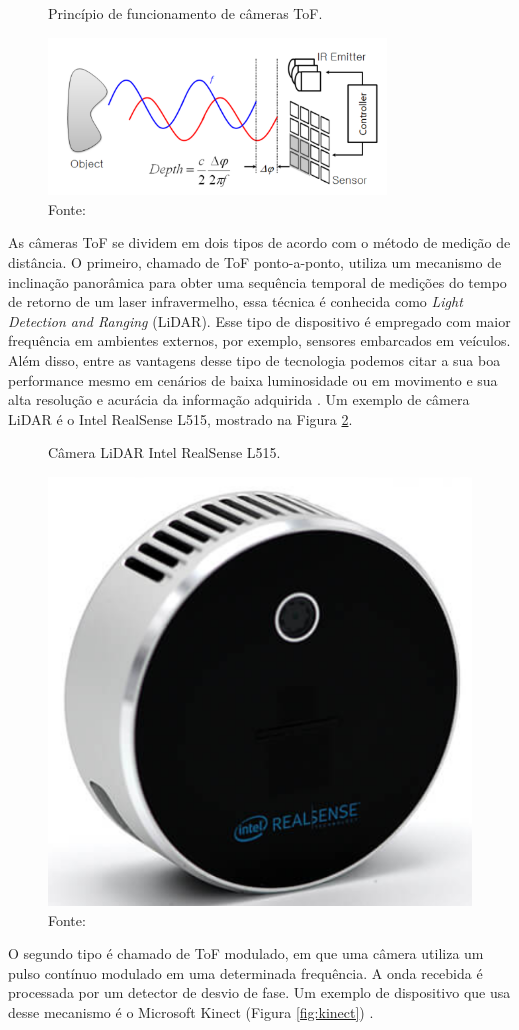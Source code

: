 \begin{figure}[h]
    \centering   
    \caption{Princípio de funcionamento de câmeras ToF.}
    \includegraphics[width=0.8\textwidth]{fig/tof_cameras.png}
    \caption*{Fonte: \cite{hansard2012time}}
    \label{fig:tof}
\end{figure}

 As câmeras ToF se dividem em dois tipos de acordo com o método de medição de distância. O primeiro, chamado de ToF ponto-a-ponto, utiliza um mecanismo de inclinação panorâmica para obter uma sequência temporal de medições do tempo de retorno de um laser infravermelho, essa técnica é conhecida como \textit{Light Detection and Ranging} (LiDAR). Esse tipo de dispositivo é empregado com maior frequência em ambientes externos, por exemplo, sensores embarcados em veículos. Além disso, entre as vantagens desse tipo de tecnologia podemos citar a sua boa performance mesmo em cenários de baixa luminosidade ou em movimento e sua alta resolução e acurácia da informação adquirida \cite{zollhofer2019commodity}. Um exemplo de câmera LiDAR é o Intel RealSense L515, mostrado na Figura \ref{fig:lidar}.

 \begin{figure}[h]
    \centering
    \caption{Câmera LiDAR Intel RealSense L515.}
    \includegraphics[width=.4\textwidth]{fig/lidar_cams.png}
    \caption*{Fonte: \cite{castellano2023performance}}
    \label{fig:lidar}
\end{figure}

O segundo tipo é chamado de ToF modulado, em que uma câmera utiliza um pulso contínuo modulado em uma determinada frequência. A onda recebida é processada por um detector de desvio de fase. Um exemplo de dispositivo que usa desse mecanismo é o Microsoft Kinect (Figura \ref{fig:kinect}) \cite{zollhofer2019commodity}.

